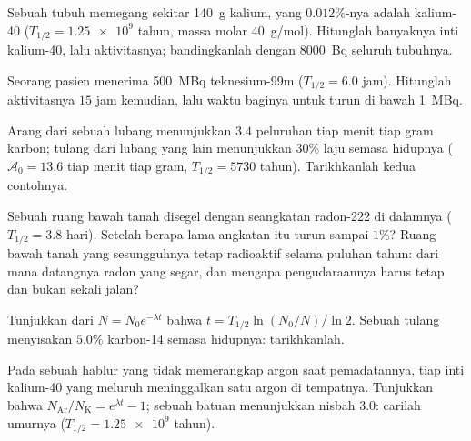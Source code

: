 \begin{exercise}[$\star\star$]\label{exo:g12:radioactive-decay:8}
Sebuah tubuh memegang sekitar \qty{140}{g} kalium, yang $0.012\%$-nya adalah
kalium-40 ($T_{1/2} = \num{1.25e9}$ tahun, massa molar \qty{40}{g/mol}).
Hitunglah banyaknya inti kalium-40, lalu aktivitasnya; bandingkanlah
dengan \qty{8000}{Bq} seluruh tubuhnya.
\end{exercise}

\begin{exercise}[$\star\star$]\label{exo:g12:radioactive-decay:9}
Seorang pasien menerima \qty{500}{MBq} teknesium-99m ($T_{1/2} = 6.0$
jam). Hitunglah aktivitasnya $15$ jam kemudian, lalu waktu baginya untuk
turun di bawah \qty{1}{MBq}.
\end{exercise}

\begin{exercise}[$\star\star$]\label{exo:g12:radioactive-decay:10}
Arang dari sebuah lubang menunjukkan $3.4$ peluruhan tiap menit tiap gram karbon;
tulang dari lubang yang lain menunjukkan $30\%$ laju semasa hidupnya ($\mathcal A_0 = 13.6$
tiap menit tiap gram, $T_{1/2} = \num{5730}$ tahun). Tarikhkanlah kedua contohnya.
\end{exercise}

\begin{exercise}[$\star\star$]\label{exo:g12:radioactive-decay:11}
Sebuah ruang bawah tanah disegel dengan seangkatan radon-222 di dalamnya ($T_{1/2} = 3.8$
hari). Setelah berapa lama  angkatan itu turun sampai $1\%$? Ruang bawah tanah
yang sesungguhnya tetap radioaktif selama puluhan tahun: dari mana datangnya radon yang segar,
dan mengapa pengudaraannya harus tetap dan bukan sekali jalan?
\end{exercise}

\begin{exercise}[$\star\star\star$]\label{exo:g12:radioactive-decay:12}
Tunjukkan dari $N = N_0 e^{-\lambda t}$ bahwa $t = T_{1/2}\ln(N_0/N)/\ln 2$. Sebuah
tulang menyisakan $5.0\%$ karbon-14 semasa hidupnya: tarikhkanlah.
\end{exercise}

\begin{exercise}[$\star\star\star$]\label{exo:g12:radioactive-decay:13}
Pada sebuah hablur yang tidak memerangkap argon saat pemadatannya, tiap inti
kalium-40 yang meluruh meninggalkan satu  argon di tempatnya. Tunjukkan bahwa
$N_{\mathrm{Ar}}/N_{\mathrm K} = e^{\lambda t} - 1$; sebuah batuan menunjukkan nisbah
$3.0$: carilah umurnya ($T_{1/2} = \num{1.25e9}$ tahun).
\end{exercise}

